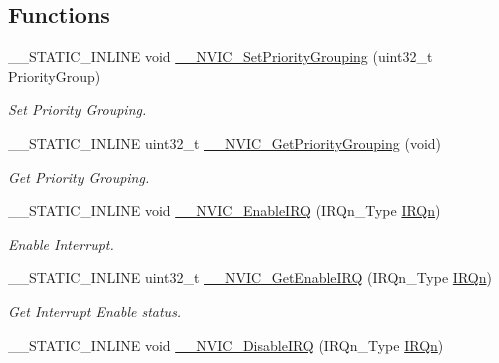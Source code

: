 \subsection*{Functions}
\begin{DoxyCompactItemize}
\item 
\+\_\+\+\_\+\+S\+T\+A\+T\+I\+C\+\_\+\+I\+N\+L\+I\+NE void \mbox{\hyperlink{group___c_m_s_i_s___core___n_v_i_c_functions_gafc94dcbaee03e4746ade1f5bb9aaa56d}{\+\_\+\+\_\+\+N\+V\+I\+C\+\_\+\+Set\+Priority\+Grouping}} (uint32\+\_\+t Priority\+Group)
\begin{DoxyCompactList}\small\item\em Set Priority Grouping. \end{DoxyCompactList}\item 
\+\_\+\+\_\+\+S\+T\+A\+T\+I\+C\+\_\+\+I\+N\+L\+I\+NE uint32\+\_\+t \mbox{\hyperlink{group___c_m_s_i_s___core___n_v_i_c_functions_ga9b894af672df4373eb637f8288845c05}{\+\_\+\+\_\+\+N\+V\+I\+C\+\_\+\+Get\+Priority\+Grouping}} (void)
\begin{DoxyCompactList}\small\item\em Get Priority Grouping. \end{DoxyCompactList}\item 
\+\_\+\+\_\+\+S\+T\+A\+T\+I\+C\+\_\+\+I\+N\+L\+I\+NE void \mbox{\hyperlink{group___c_m_s_i_s___core___n_v_i_c_functions_ga71227e1376cde11eda03fcb62f1b33ea}{\+\_\+\+\_\+\+N\+V\+I\+C\+\_\+\+Enable\+I\+RQ}} (I\+R\+Qn\+\_\+\+Type \mbox{\hyperlink{group___interrupt__vector__numbers_ga666eb0caeb12ec0e281415592ae89083}{I\+R\+Qn}})
\begin{DoxyCompactList}\small\item\em Enable Interrupt. \end{DoxyCompactList}\item 
\+\_\+\+\_\+\+S\+T\+A\+T\+I\+C\+\_\+\+I\+N\+L\+I\+NE uint32\+\_\+t \mbox{\hyperlink{group___c_m_s_i_s___core___n_v_i_c_functions_gaaeb5e7cc0eaad4e2817272e7bf742083}{\+\_\+\+\_\+\+N\+V\+I\+C\+\_\+\+Get\+Enable\+I\+RQ}} (I\+R\+Qn\+\_\+\+Type \mbox{\hyperlink{group___interrupt__vector__numbers_ga666eb0caeb12ec0e281415592ae89083}{I\+R\+Qn}})
\begin{DoxyCompactList}\small\item\em Get Interrupt Enable status. \end{DoxyCompactList}\item 
\+\_\+\+\_\+\+S\+T\+A\+T\+I\+C\+\_\+\+I\+N\+L\+I\+NE void \mbox{\hyperlink{group___c_m_s_i_s___core___n_v_i_c_functions_gae016e4c1986312044ee768806537d52f}{\+\_\+\+\_\+\+N\+V\+I\+C\+\_\+\+Disable\+I\+RQ}} (I\+R\+Qn\+\_\+\+Type \mbox{\hyperlink{group___interrupt__vector__numbers_ga666eb0caeb12ec0e281415592ae89083}{I\+R\+Qn}})

\end{DoxyCompactItemize}
